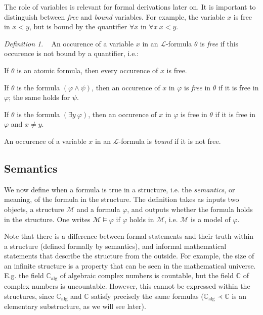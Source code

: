 \documentclass[a4paper, 11pt]{amsart}
\theoremstyle{remark}
\newtheorem{definition}[definition]{Definition}
\newcommand{\CC}{\mathbb C}
\newcommand{\cL}{\mathcal L}
\newcommand{\cM}{\mathcal M}
\newenvironment{enumerate-(a)}{\begin{enumerate}[label={\upshape (\alph*)}, leftmargin=2pc]}{\end{enumerate}}
\newenvironment{enumerate-(1)}{\begin{enumerate}[label={\upshape (\arabic*)}, leftmargin=2pc]}{\end{enumerate}}
\begin{document}
The role of variables is relevant for formal derivations later on. 
It is important to distinguish between \emph{free} and \emph{bound} variables. 
For example, the variable $x$ is free in $x<y$, but is bound by the quantifier $\forall x$ in $\forall x\ x<y$. 

\begin{definition} \ 
An occurence of a variable $x$ in an $\cL$-formula $\theta$ is \emph{free} if this occurence is not bound by a quantifier, i.e.: 
\begin{enumerate-(a)} 
\item 
If $\theta$ is an atomic formula, then every occurence of $x$ is free. 
\item 
If $\theta$ is the formula $(\varphi \wedge \psi)$, then an occurence of $x$ in $\varphi$ is \emph{free} in $\theta$ if it is free in $\varphi$; the same holds for $\psi$. 
\item 
If $\theta$ is the formula $(\exists y\ \varphi)$, then an occurence of $x$ in $\varphi$ is free in $\theta$ if it is free in $\varphi$ and $x\neq y$. 
\end{enumerate-(a)} 
An occurence of a variable $x$ in an $\cL$-formula is \emph{bound} if it is not free. 
\end{definition} 








\subsection{Semantics} 

We now define when a formula is true in a structure, i.e. the \emph{semantics}, or meaning, of the formula in the structure. 
The definition takes as inputs two objects, a structure $\cM$ and a formula $\varphi$, and outputs whether the formula holds in the structure. 
One writes $\cM\models \varphi$ if $\varphi$ holds in $\cM$, i.e. $\cM$ is a model of $\varphi$. 

Note that there is a difference between formal statements and their truth within a structure (defined formally by semantics), and informal mathematical statements that describe the structure from the outside. 
For example, the size of an infinite structure is a property that can be seen in the mathematical universe. 
E.g. the field $\CC_{\mathrm{alg}}$ of algebraic complex numbers is countable, but the field $\CC$ of complex numbers is uncountable. 
However, this cannot be expressed within the structures, since $\CC_{\mathrm{alg}}$ and  $\CC$ satisfy precisely the same formulas ($\CC_{\mathrm{alg}}\prec \CC$ is an elementary substructure, as we will see later). 
\end{document}
